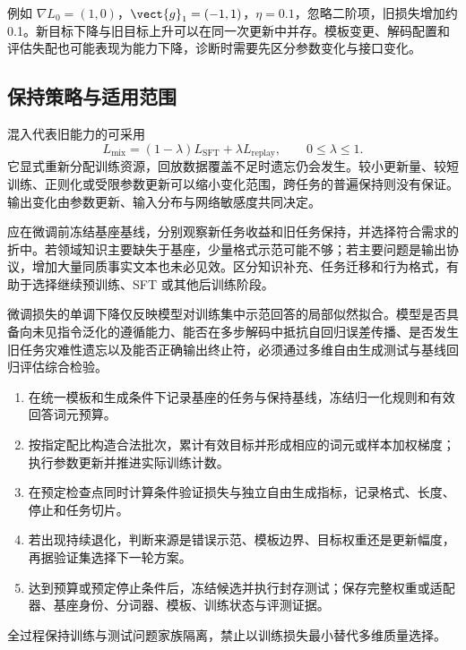 \documentclass[../textbook.tex]{subfiles}
\begin{document}
例如 $\nabla L_0=(1,0)$，$\vect{g}_1=(-1,1)$，$\eta=0.1$，忽略二阶项，旧损失增加约0.1。新目标下降与旧目标上升可以在同一次更新中并存。模板变更、解码配置和评估失配也可能表现为能力下降，诊断时需要先区分参数变化与接口变化。

\subsection{保持策略与适用范围}
混入代表旧能力的可采用
\begin{equation}
 L_{\mathrm{mix}}=(1-\lambda)L_{\mathrm{SFT}}+\lambda L_{\mathrm{replay}},
 \qquad0\le\lambda\le1.
\end{equation}
它显式重新分配训练资源，回放数据覆盖不足时遗忘仍会发生。较小更新量、较短训练、正则化或受限参数更新可以缩小变化范围，跨任务的普遍保持则没有保证。输出变化由参数更新、输入分布与网络敏感度共同决定。

应在微调前冻结基座基线，分别观察新任务收益和旧任务保持，并选择符合需求的折中。若领域知识主要缺失于基座，少量格式示范可能不够；若主要问题是输出协议，增加大量同质事实文本也未必见效。区分知识补充、任务迁移和行为格式，有助于选择继续预训练、SFT 或其他后训练阶段。

\begin{note}[监督微调的拟合限度与泛化边界]
微调损失的单调下降仅反映模型对训练集中示范回答的局部似然拟合。模型是否具备向未见指令泛化的遵循能力、能否在多步解码中抵抗自回归误差传播、是否发生旧任务灾难性遗忘以及能否正确输出终止符，必须通过多维自由生成测试与基线回归评估综合检验。
\end{note}

\begin{algorithm}[监督微调与模型选择]
\begin{enumerate}
\item 在统一模板和生成条件下记录基座的任务与保持基线，冻结归一化规则和有效回答词元预算。
\item 按指定配比构造合法批次，累计有效目标并形成相应的词元或样本加权梯度；执行参数更新并推进实际训练计数。
\item 在预定检查点同时计算条件验证损失与独立自由生成指标，记录格式、长度、停止和任务切片。
\item 若出现持续退化，判断来源是错误示范、模板边界、目标权重还是更新幅度，再据验证集选择下一轮方案。
\item 达到预算或预定停止条件后，冻结候选并执行封存测试；保存完整权重或适配器、基座身份、分词器、模板、训练状态与评测证据。
\end{enumerate}
全过程保持训练与测试问题家族隔离，禁止以训练损失最小替代多维质量选择。
\end{algorithm}
\end{document}
